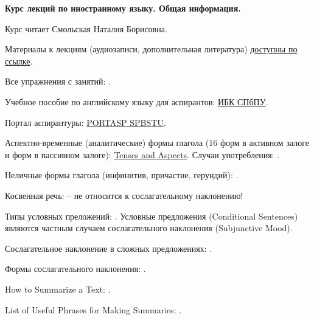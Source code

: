 \documentclass[main.tex]{subfiles}
\begin{document}
{\parindent0pt

\textbf{Курс лекций по иностранному языку. Общая информация.}

\vspace{3pt}

Курс читает Смольская Наталия Борисовна.

Материалы к лекциям (аудиозаписи, дополнительная литература) \href{https://drive.google.com/drive/folders/1iSx2EjJJ98rhPpOsM4xGcJA7-7qitQHM?usp=sharing}{доступны по ссылке}.

Все упражнения с занятий: \hyperref[sec:all-tasks-lk]{\color{blue}{УПРАЖНЕНИЯ}}.

Учебное пособие по английскому языку для аспирантов: \href{https://elib.spbstu.ru/dl/2/s19-119.pdf/info}{ИБК СПбПУ}.

Портал аспирантуры: \href{https://portasp.spbstu.ru/login/index.php}{PORTASP SPBSTU}.

\vspace{3pt}

Аспектно-временные (аналитические) формы глагола (16 форм в активном залоге и  форм в пассивном залоге): \href{https://mualal.github.io/asp/english/EnglishTensesAspectsVoicesPoster.pdf}{Tenses and Aspects}.
Случаи употребления: \hyperref[subsec:tenses-usage]{\color{blue}{Tenses Usage}}.

\vspace{3pt}

Неличные формы глагола (инфинитив, причастие, герундий): \hyperref[subsec:impersonal-lk]{\color{blue}{IMPERSONAL FORMS}}.

\vspace{3pt}

Косвенная речь: \hyperref[subsec:reported-speech]{\color{blue}{REPORTED SPEECH}} -- не относится к сослагательному наклонению!

\vspace{3pt}

Типы условных преложений: \hyperref[subsec:conditionals-types]{\color{blue}{CONDITIONALS}}. Условные предложения (Conditional Sentences) являются частным случаем сослагательного наклонения (Subjunctive Mood).

\vspace{3pt}

Сослагательное наклонение в сложных предложениях: \hyperref[subsec:subjunctive-mood-lk]{\color{blue}{SUBJUNCTIVE MOOD}}.

Формы сослагательного наклонения: \hyperlink{subjunctive-mood-forms-table}{\color{blue}{Subjunctive Mood Forms}}.

\vspace{3pt}

How to Summarize a Text: \hyperref[subsec:tips-on-summarizing]{\color{blue}{TIPS ON SUMMARIZING}}.

List of Useful Phrases for Making Summaries: \hyperref[subsec:list-of-useful-phrases-for-making-summaries]{\color{blue}{LIST OF PHRASES}}.

}
\end{document}
